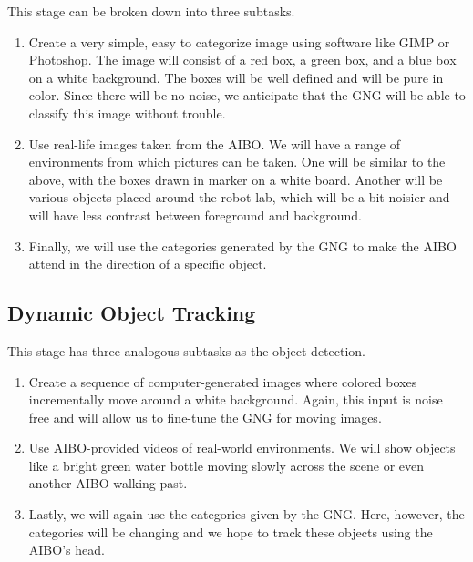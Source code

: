 \documentclass{article}
\begin{document}
This stage can be broken down into three subtasks.

\begin{enumerate}
  \item Create a very simple, easy to categorize image using software like GIMP or Photoshop. The image will consist of a red box, a green box, and a blue box on a white background. The boxes will be well defined and will be pure in color. Since there will be no noise, we anticipate that the GNG will be able to classify this image without trouble.
  \item Use real-life images taken from the AIBO. We will have a range of environments from which pictures can be taken. One will be similar to the above, with the boxes drawn in marker on a white board. Another will be various objects placed around the robot lab, which will be a bit noisier and will have less contrast between foreground and background.
  \item Finally, we will use the categories generated by the GNG to make the AIBO attend in the direction of a specific object.
\end{enumerate}

\subsection{Dynamic Object Tracking}

This stage has three analogous subtasks as the object detection.

\begin{enumerate}
  \item Create a sequence of computer-generated images where colored boxes incrementally move around a white background. Again, this input is noise free and will allow us to fine-tune the GNG for moving images.
  \item Use AIBO-provided videos of real-world environments. We will show objects like a bright green water bottle moving slowly across the scene or even another AIBO walking past.
  \item Lastly, we will again use the categories given by the GNG. Here, however, the categories will be changing and we hope to track these objects using the AIBO's head.
\end{enumerate}
\end{document}
